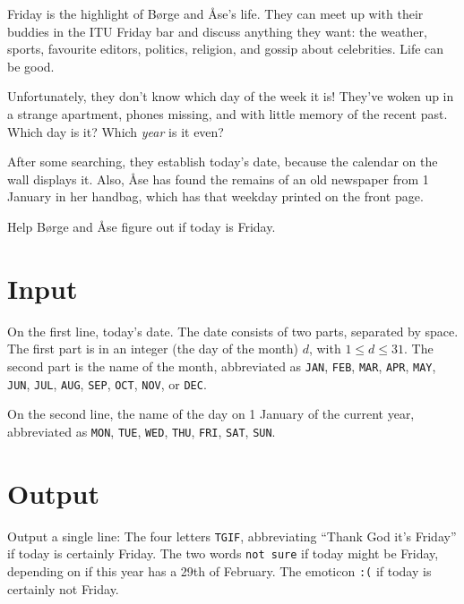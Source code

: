 

Friday is the highlight of Børge and Åse’s life.
They can meet up with their buddies in the ITU Friday bar and discuss anything they want: the weather, sports, favourite editors, politics, religion, and gossip about celebrities.
Life can be good.

Unfortunately, they don’t know which day of the week it is!
They’ve woken up in a strange apartment, phones missing, and with little memory of the recent past.
Which day is it? Which \emph{year} is it even?

After some searching, they establish today’s date, because the calendar on the wall displays it.
Also, Åse has found the remains of an old newspaper from 1 January in her handbag, which has that weekday printed on the front page.

Help Børge and Åse figure out if today is Friday.

\section*{Input}

On the first line, today’s date.
The date consists of two parts, separated by space.
The first part is in an integer (the day of the month) $d$, with $1\leq d\leq 31$.
The second part is the name of the month, abbreviated as \texttt{JAN}, \texttt{FEB}, \texttt{MAR}, \texttt{APR},
\texttt{MAY}, \texttt{JUN}, \texttt{JUL}, \texttt{AUG}, \texttt{SEP}, \texttt{OCT}, \texttt{NOV}, or \texttt{DEC}.

On the second line, the name of the day on 1 January of the current year, abbreviated as \texttt{MON}, \texttt{TUE}, \texttt{WED}, \texttt{THU}, \texttt{FRI}, \texttt{SAT}, \texttt{SUN}.


\section*{Output}

Output a single line:
The four letters \texttt{TGIF}, abbreviating ``Thank God it's Friday'' if today is certainly Friday.
The two words \texttt{not sure} if today might be Friday, depending on if this year has a 29th of February.
The emoticon \texttt{:(} if today is certainly not Friday.
